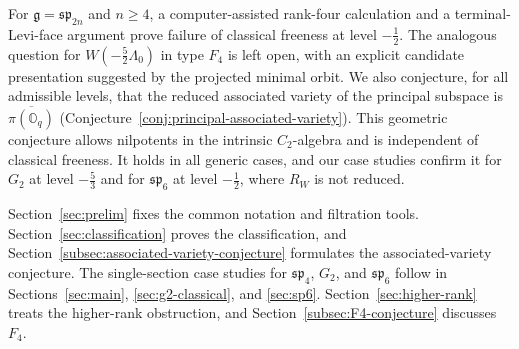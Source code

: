 \documentclass[11pt]{amsart}
\theoremstyle{definition}
\theoremstyle{remark}
\newcommand{\g}{\mathfrak g}
\DeclareMathOperator{\ch}{ch}
\begin{document}

\color{black}

For $\g=\mathfrak{sp}_{2n}$ and $n\ge4$, a computer-assisted rank-four
calculation and a terminal-Levi-face argument prove failure of classical
freeness at level $-\frac12$. The analogous question for
$W(-\frac52\Lambda_0)$ in type $F_4$ is left open, with an explicit
candidate presentation suggested by the projected minimal orbit.
We also conjecture, for all admissible levels, that the reduced associated variety
of the principal subspace is $\overline{\pi(\mathbb O_q)}$
(Conjecture~\ref{conj:principal-associated-variety}). This geometric conjecture allows nilpotents in the
intrinsic $C_2$-algebra and is independent of classical freeness. It holds in all
generic cases, and our case studies confirm it for $G_2$ at level $-\tfrac53$ and for
$\mathfrak{sp}_6$ at level $-\tfrac12$, where $R_W$ is not reduced.


Section~\ref{sec:prelim} fixes the common notation and filtration tools.
Section~\ref{sec:classification} proves the classification, and
Section~\ref{subsec:associated-variety-conjecture} formulates the
associated-variety conjecture. The single-section case studies for
$\mathfrak{sp}_4$, $G_2$, and $\mathfrak{sp}_6$ follow in
Sections~\ref{sec:main}, \ref{sec:g2-classical}, and
\ref{sec:sp6}. Section~\ref{sec:higher-rank} treats the higher-rank
obstruction, and Section~\ref{subsec:F4-conjecture} discusses $F_4$.
\end{document}
